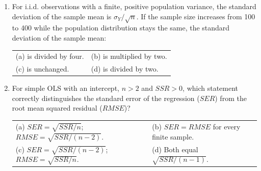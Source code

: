 \documentclass[a4paper,11pt,twoside]{article}
\makeatletter
\newcommand{\mcoptions}[4]{\par\nobreak\smallskip
  \begin{tabularx}{\linewidth}{@{}X X@{}}
  (a) #1 & (b) #2 \\
  (c) #3 & (d) #4
  \end{tabularx}}
\makeatother
\begin{document}
\begin{enumerate}[label=\arabic*.,leftmargin=*,itemsep=5pt,topsep=4pt,parsep=0pt]
\item For i.i.d. observations with a finite, positive population variance,
the standard deviation of the sample mean is $\sigma_Y/\sqrt n$.
If the sample size increases from 100 to 400 while the population distribution
stays the same, the standard deviation of the sample mean:
\mcoptions{is divided by four.}{is multiplied by two.}
{is unchanged.}{is divided by two.}

\item For simple OLS with an intercept, $n>2$ and $SSR>0$, which statement
correctly distinguishes the standard error of the regression ($SER$) from
the root mean squared residual ($RMSE$)?
\mcoptions{$SER=\sqrt{SSR/n}$; $RMSE=\sqrt{SSR/(n-2)}$.}
{$SER=RMSE$ for every finite sample.}
{$SER=\sqrt{SSR/(n-2)}$; $RMSE=\sqrt{SSR/n}$.}
{Both equal $\sqrt{SSR/(n-1)}$.}

\end{enumerate}
\Needspace{7.5cm}
\end{document}

